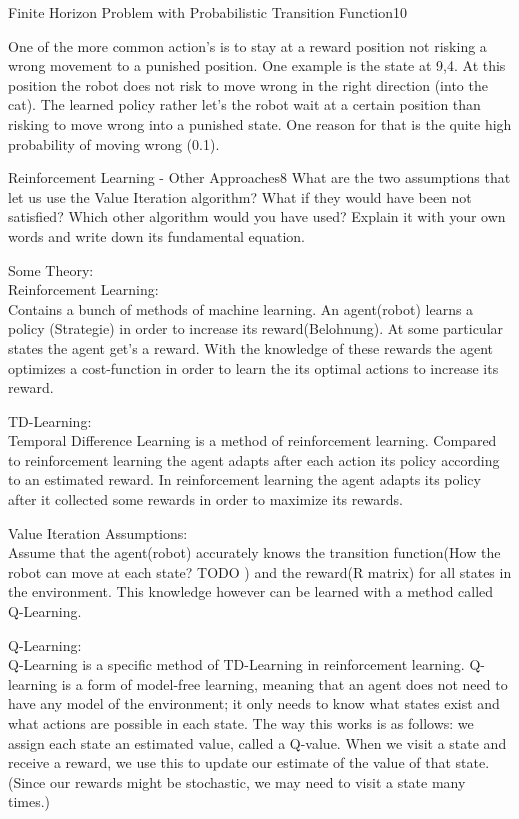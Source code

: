 \begin{questions}
\begin{question}{Finite Horizon Problem with Probabilistic Transition Function}{10}
\begin{answer}
\end{answer}

One of the more common action's is to stay at a reward position not risking a wrong movement to a punished position. One example is the state at 9,4. At this position the robot does not risk to move wrong in the right direction (into the cat). The learned policy rather let's the robot wait at a certain position than risking to move wrong into a punished state. One reason for that is the quite high probability of moving wrong (0.1).

\end{question}



\begin{question}[bonus]{Reinforcement Learning - Other Approaches}{8}
What are the two assumptions that let us use the Value Iteration algorithm? What if they would have been not satisfied? Which other algorithm would you have used? Explain it with your own words and write down its fundamental equation.

\begin{answer}
Some Theory:\\
Reinforcement Learning:\\
Contains a bunch of methods of machine learning. An agent(robot) learns a policy (Strategie) in order to increase its reward(Belohnung). At some particular states the agent get's a reward. With the knowledge of these rewards the agent optimizes a cost-function in order to learn the its optimal actions to increase its reward.

TD-Learning:\\
Temporal Difference Learning is a method of reinforcement learning. Compared to reinforcement learning the agent adapts after each action its policy according to an estimated reward. In reinforcement learning the agent adapts its policy after it collected some rewards in order to maximize its rewards. 


Value Iteration Assumptions:\\
Assume that the agent(robot) accurately knows the transition function(How the robot can move at each state? TODO ) and the reward(R matrix) for all states in the environment. This knowledge however can be learned with a method called Q-Learning.

Q-Learning:\\
Q-Learning is a specific method of TD-Learning in reinforcement learning. 
Q-learning is a form of model-free learning, meaning that an agent does not need to have any model of the environment; it only needs to know what states exist and what actions are possible in each state.
The way this works is as follows: we assign each state an estimated value, called a Q-value. When we visit a state and receive a reward, we use this to update our estimate of the value of that state. (Since our rewards might be stochastic, we may need to visit a state many times.)


\end{answer}
\end{question}
\end{questions}
